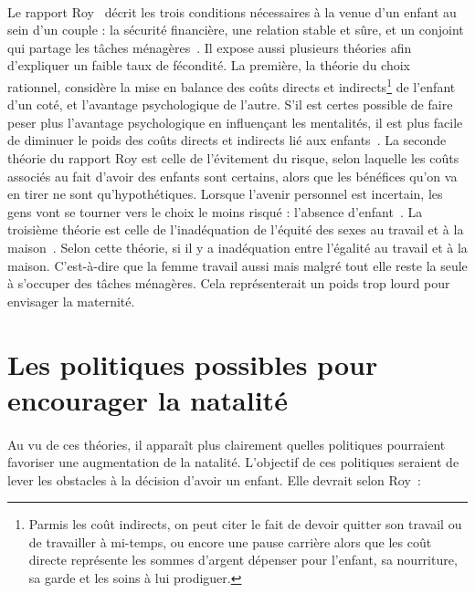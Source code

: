 \paragraph{}Le rapport Roy~\citep{quebec} décrit les trois conditions nécessaires à la venue d’un enfant au sein d’un couple : la sécurité financière, une relation stable et sûre, et un conjoint qui partage les tâches ménagères~\citep[pp.19]{quebec}. Il expose aussi plusieurs théories afin d'expliquer un faible taux de fécondité. La première, la théorie du choix rationnel, considère la mise en balance des coûts directs et indirects\footnote{Parmis les coût indirects, on peut citer le fait de devoir quitter son travail ou de travailler à mi-temps, ou encore une pause carrière alors que les coût directe représente les sommes d'argent dépenser pour l'enfant, sa nourriture, sa garde et les soins à lui prodiguer.} de l’enfant d’un coté, et l’avantage psychologique de l’autre. S'il est certes possible de faire peser plus l’avantage psychologique en influençant les mentalités, il est plus facile de diminuer le poids des coûts directs et indirects lié aux enfants~\citep[pp.23]{quebec}. La seconde théorie du rapport Roy est celle de l’évitement du risque, selon laquelle les coûts associés au fait d’avoir des enfants sont certains, alors que les bénéfices qu’on va en tirer ne sont qu'hypothétiques. Lorsque l'avenir personnel est incertain, les gens vont se tourner vers le choix le moins risqué : l’absence d’enfant~\citep[pp.24]{quebec}. La troisième théorie est celle de l'inadéquation de l’équité des sexes au travail et à la maison~\citep[pp.25]{quebec}. Selon cette théorie, si il y a inadéquation entre l'égalité au travail et à la maison. C'est-à-dire que la femme travail aussi mais malgré tout elle reste la seule à s'occuper des tâches ménagères. Cela représenterait un poids trop lourd pour envisager la maternité.

\section{Les politiques possibles pour encourager la natalité}
\paragraph{}Au vu de ces théories, il apparaît plus clairement quelles politiques pourraient favoriser une augmentation de la natalité. L’objectif de ces politiques seraient de lever les obstacles à la décision d’avoir un enfant. Elle devrait selon Roy~\citep[pp.43-46]{quebec}:

